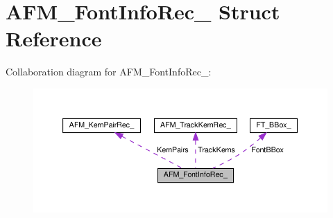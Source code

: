 \hypertarget{structAFM__FontInfoRec__}{}\section{A\+F\+M\+\_\+\+Font\+Info\+Rec\+\_\+ Struct Reference}
\label{structAFM__FontInfoRec__}


Collaboration diagram for A\+F\+M\+\_\+\+Font\+Info\+Rec\+\_\+\+:
\nopagebreak
\begin{figure}[H]
\begin{center}
\leavevmode
\includegraphics[width=350pt]{structAFM__FontInfoRec____coll__graph}
\end{center}
\end{figure}
